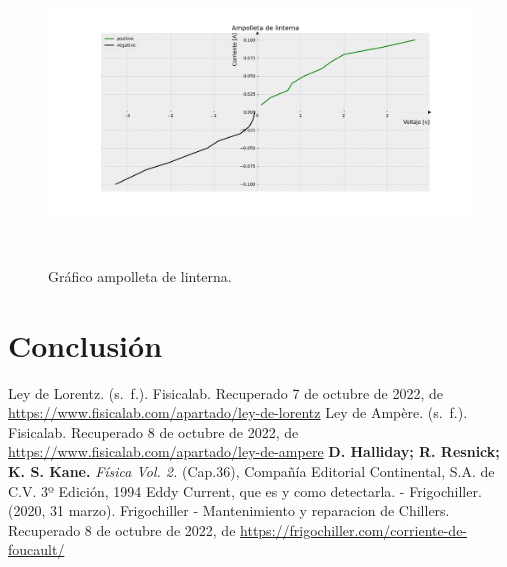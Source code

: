 \documentclass[]{article}
\begin{document}
\begin{figure}
  \centering
  \includegraphics[width=12cm, height=8cm]{img/Figure_1.png}
  \caption{\label{fig: fig-ampolleta}Gráfico ampolleta de linterna.} 
\end{figure}


\section*{Conclusión}


\begin{thebibliography}{5}
    Ley de Lorentz. (s. f.). Fisicalab. Recuperado 7 de octubre de 2022, 
  de \url{https://www.fisicalab.com/apartado/ley-de-lorentz}
  Ley de Ampère. (s. f.). Fisicalab. Recuperado 8 de octubre de 2022, 
  de \url{https://www.fisicalab.com/apartado/ley-de-ampere}
   \textbf{D. Halliday; R. Resnick; K. S. Kane.} \textit{Física Vol. 2.} (Cap.36), Compañía Editorial Continental, S.A. de C.V. 3º Edición, 1994
   Eddy Current, que es y como detectarla. - Frigochiller. (2020, 31 marzo). Frigochiller - Mantenimiento y reparacion de Chillers. Recuperado 8 de octubre de 2022, 
  de \url{https://frigochiller.com/corriente-de-foucault/}
\end{thebibliography}
\end{document}
